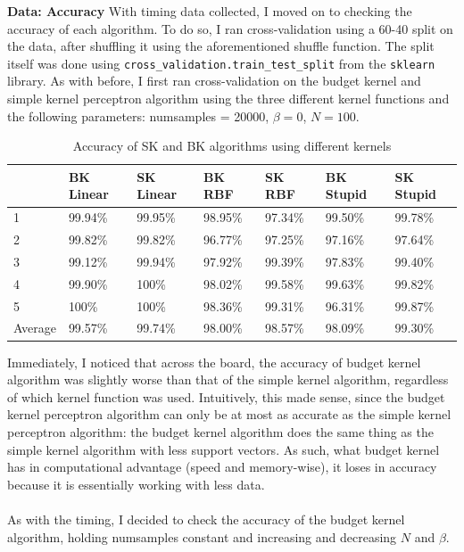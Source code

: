 \documentclass[submit]{harvardml}
\begin{document}
\textbf{Data: Accuracy}
With timing data collected, I moved on to checking the accuracy of each algorithm. To do so, I ran cross-validation using a 60-40 split on the data, after shuffling it using the aforementioned shuffle function. The split itself was done using \texttt{cross\_validation.train\_test\_split} from the \texttt{sklearn} library. As with before, I first ran cross-validation on the budget kernel and simple kernel perceptron algorithm using the three different kernel functions and the following parameters: numsamples = 20000, $\beta = 0$, $N = 100$. 
\begin{table}[hbt]
\centering
\caption{Accuracy of SK and BK algorithms using different kernels}
\label{my-label}
\begin{tabular}{l|llllll}
        & BK Linear & SK Linear & BK RBF  & SK RBF  & BK Stupid & SK Stupid \\ \hline
1       & 99.94\%   & 99.95\%   & 98.95\% & 97.34\% & 99.50\%   & 99.78\%   \\
2       & 99.82\%   & 99.82\%   & 96.77\% & 97.25\% & 97.16\%   & 97.64\%   \\
3       & 99.12\%   & 99.94\%   & 97.92\% & 99.39\% & 97.83\%   & 99.40\%   \\
4       & 99.90\%   & 100\%     & 98.02\% & 99.58\% & 99.63\%   & 99.82\%   \\
5       & 100\%     & 100\%     & 98.36\% & 99.31\% & 96.31\%   & 99.87\%   \\ \hline
Average & 99.57\%   & 99.74\%   & 98.00\% & 98.57\% & 98.09\%   & 99.30\%  
\end{tabular}
\end{table}
Immediately, I noticed that across the board, the accuracy of budget kernel algorithm was slightly worse than that of the simple kernel algorithm, regardless of which kernel function was used. Intuitively, this made sense, since the budget kernel perceptron algorithm can only be at most as accurate as the simple kernel perceptron algorithm: the budget kernel algorithm does the same thing as the simple kernel algorithm with less support vectors. As such, what budget kernel has in computational advantage (speed and memory-wise), it loses in accuracy because it is essentially working with less data. \\ \\
As with the timing, I decided to check the accuracy of the budget kernel algorithm, holding numsamples constant and increasing and decreasing $N$ and $\beta$. 
\end{document}
